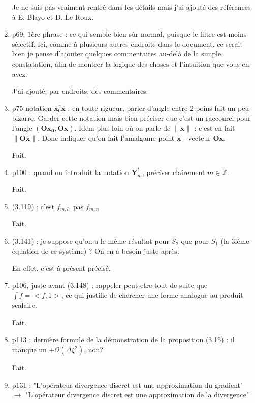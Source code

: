 \documentclass[10pt,a4paper]{article}
\begin{document}
\begin{enumerate}
{\color{blue} Je ne suis pas vraiment rentré dans les détails mais j'ai ajouté des références à E. Blayo et D. Le Roux.} 


\item p69, 1ère phrase : ce qui semble bien sûr normal, puisque le filtre est moins sélectif. Ici, comme à plusieurs autres endroits dans le document, ce serait bien je pense d'ajouter quelques commentaires au-delà de la simple constatation, afin de montrer la logique des choses et l'intuition que vous en avez.

{\color{blue} J'ai ajouté, par endroits, des commentaires.} 


\item p75 notation $\widehat{\mathbf{x}_0 \mathbf{x}}$ : en toute rigueur, parler d'angle entre 2 poins fait un peu bizarre. Garder cette notation mais bien préciser que c'est un raccourci pour l'angle $(\mathbf{Ox_0}, \mathbf{Ox})$. Idem plus loin où on parle de $\| \mathbf{x} \|$ : c'est en fait $\| \mathbf{Ox} \|$. Donc indiquer qu'on fait l'amalgame point $\mathbf{x}$ - vecteur $\mathbf{Ox}$.

{\color{blue} Fait.} 

\item p100 : quand on introduit la notation $\mathbf{Y}_m^l$, préciser clairement $m \in \mathbb{Z}$.

{\color{blue} Fait.} 


\item (3.119) : c'est $f_{m,l}$, pas $f_{m,n}$

{\color{blue} Fait.} 

\item (3.141) : je suppose qu'on a le même résultat pour $S_2$ que pour $S_1$ (la 3ième équation de ce système) ? On en a besoin juste après.

{\color{blue} En effet, c'est à présent précisé.} 

\item p106, juste avant (3.148) : rappeler peut-etre tout de suite que $\int f = <f,1>$, ce qui justifie de chercher une forme analogue au produit scalaire.

{\color{blue} Fait.} 


\item p113 : dernière formule de la démonstration de la proposition (3.15) : il manque un $+ \mathcal{O}(\Delta \xi^2)$, non?

{\color{blue} Fait.} 

\item p131 : "L'opérateur divergence discret est une approximation du gradient" $\rightarrow$ "L'opérateur divergence discret est une approximation de la divergence"


\end{enumerate}
\end{document}
